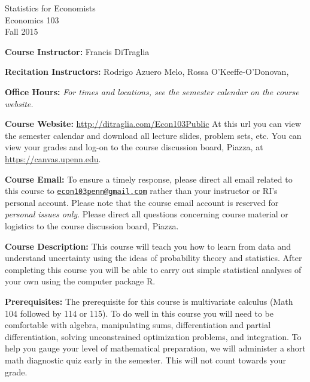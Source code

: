 \documentclass[11pt, letterpaper]{article}
\begin{document}
\thispagestyle{plain}

\begin{center}
\Large
\sc
Statistics for Economists\\
\large
Economics 103\\
\large
Fall 2015
\end{center}


\normalsize
\bigskip
\noindent \textbf{Course Instructor:} Francis DiTraglia 

\medskip


\noindent \textbf{Recitation Instructors:}
  Rodrigo Azuero Melo, 
  Rossa O'Keeffe-O'Donovan,
\medskip


\noindent \textbf{Office Hours:} \emph{For times and locations, see the semester calendar on the course website.}


\medskip
 
\noindent \textbf{Course Website:} \url{http://ditraglia.com/Econ103Public} At this url you can view the semester calendar and download all lecture slides, problem sets, etc.
You can view your grades and log-on to the course discussion board, Piazza, at \url{https://canvas.upenn.edu}.

\medskip

\noindent \textbf{Course Email:} To ensure a timely response, please direct all email related to this course to \href{mailto:econ103penn@gmail.com}{\texttt{econ103penn@gmail.com}} rather than your instructor or RI's personal account.
Please note that the course email account is reserved for \emph{personal issues only}. 
Please direct all questions concerning course material or logistics to the course discussion board, Piazza.

\medskip



\noindent \textbf{Course Description:} 
This course will teach you how to learn from data and understand uncertainty using the ideas of probability theory and statistics. 
After completing this course you will be able to carry out simple statistical analyses of your own using the computer package R.


\medskip

\noindent \textbf{Prerequisites:} 
The prerequisite for this course is multivariate calculus (Math 104 followed by 114 or 115). 
To do well in this course you will need to be comfortable with algebra, manipulating sums, differentiation and partial differentiation, solving unconstrained optimization problems, and integration. 
To help you gauge your level of mathematical preparation, we will administer a short math diagnostic quiz early in the semester.
This will not count towards your grade.
\end{document}
